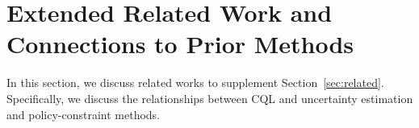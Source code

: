 
\section{Extended Related Work and Connections to Prior Methods}
\label{sec:extended_related_work}

In this section, we discuss related works to supplement Section~\ref{sec:related}. Specifically, we discuss the relationships between CQL and uncertainty estimation and policy-constraint methods.



